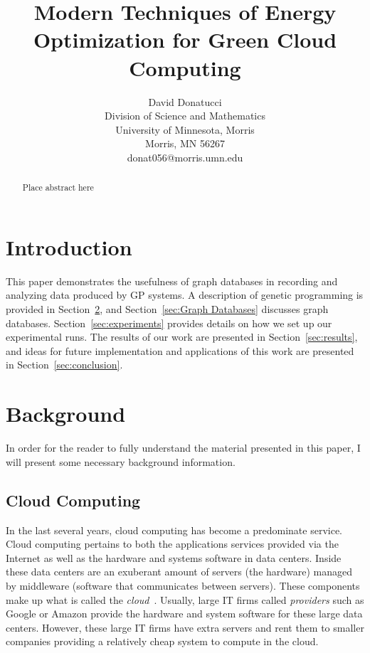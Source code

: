 \documentclass{sig-alternate}
\title{Modern Techniques of Energy Optimization for Green Cloud Computing}
\author{
\alignauthor
 		David Donatucci\\
        Division of Science and Mathematics\\
        University of Minnesota, Morris\\
        Morris, MN 56267\\
        donat056@morris.umn.edu\\
}
\date{}
\begin{document}
\pagestyle{plain}

\maketitle

\begin{abstract}

Place abstract here

\end{abstract}


\section{Introduction} \label{sec:intro}

This paper demonstrates the usefulness of graph databases in recording and analyzing data produced by GP systems. A description of genetic programming is provided in Section~\ref{Background}, and Section~\ref{sec:Graph Databases} discusses graph databases. Section~\ref{sec:experiments} provides details on how we set up our experimental runs. The results of our work are presented in Section~\ref{sec:results}, and ideas for future implementation and applications of this work are presented in Section~\ref{sec:conclusion}.

\section{Background} \label{Background}

In order for the reader to fully understand the material presented in this paper, I will present some necessary background information.

\subsection{Cloud Computing}
\label{sec:Cloud Computing}

In the last several years, cloud computing has become a predominate service. Cloud computing pertains to both the applications services provided via the Internet as well as the hardware and systems software in data centers. Inside these data centers are an exuberant amount of servers (the hardware) managed by middleware (software that communicates between servers). These components make up what is called the \emph{cloud}~\cite{Armbrust}. Usually, large IT firms called \emph{providers} such as Google or Amazon provide the hardware and system software for these large data centers. However, these large IT firms have extra servers and rent them to smaller companies providing a relatively cheap system to compute in the cloud. 
\end{document}
